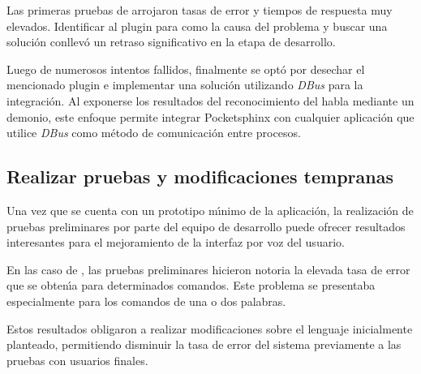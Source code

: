 Las primeras pruebas de  arrojaron tasas de error y tiempos de
respuesta muy elevados. Identificar al plugin para  como la causa del problema
y buscar una soluci\'on conllev\'o un retraso significativo en la etapa de desarrollo.

Luego de numerosos intentos fallidos, finalmente se opt\'o por desechar el mencionado plugin
e implementar una soluci\'on utilizando \emph{DBus} para la integraci\'on. Al exponerse los
resultados del reconocimiento del habla mediante un demonio, este enfoque permite integrar
Pocketsphinx con cualquier aplicaci\'on que utilice \emph{DBus} como m\'etodo de comunicaci\'on
entre procesos.

\subsection{Realizar pruebas y modificaciones tempranas}
Una vez que se cuenta con un prototipo m{\'\i}nimo de la aplicaci\'on, la realizaci\'on de pruebas preliminares
por parte del equipo de desarrollo puede ofrecer resultados interesantes para el mejoramiento de la 
interfaz por voz del usuario.

En las caso de , las pruebas preliminares hicieron notoria la elevada tasa
de error que se obten{\'\i}a para determinados comandos. Este problema se presentaba especialmente para
los comandos de una o dos palabras.

Estos resultados obligaron a realizar modificaciones sobre el lenguaje inicialmente planteado,
permitiendo disminuir la tasa de error del sistema previamente a las pruebas con usuarios
finales.